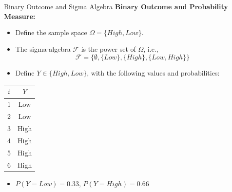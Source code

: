 \documentclass[xcolor=svgnames,t]{beamer}
\begin{document}
\begin{frame}{Binary Outcome and Sigma Algebra}
    \textbf{Binary Outcome and Probability Measure:}
    \begin{itemize}
      \item Define the sample space \( \Omega = \{High, Low\} \).
      \item The sigma-algebra \( \mathcal{F} \) is the power set of \( \Omega \), i.e.,
      \[
      \mathcal{F} = \{\emptyset, \{Low\}, \{High\}, \{Low, High\}\}
      \]
      \item Define \( Y \in \{High, Low\} \), with the following values and probabilities:
    \end{itemize}
    
    \vspace{0.3cm}
    \centering
    \begin{table}[]
        \begin{tabular}{|c|c|}
            \hline
            \( i \) & \( Y \) \\ \hline
            1 & Low  \\ \hline
            2 & Low  \\ \hline
            \rowcolor{blue!20} 3 & High \\ \hline
            \rowcolor{blue!20} 4 & High \\ \hline
            \rowcolor{blue!20} 5 & High \\ \hline
            \rowcolor{blue!20} 6 & High \\ \hline
            \end{tabular}
    \end{table}
    
    \small{
    \begin{itemize}
        \item \( P(Y = Low) = 0.33 \), \( P(Y = High) = 0.66 \)
    \end{itemize}
    }
\end{frame}
\end{document}

